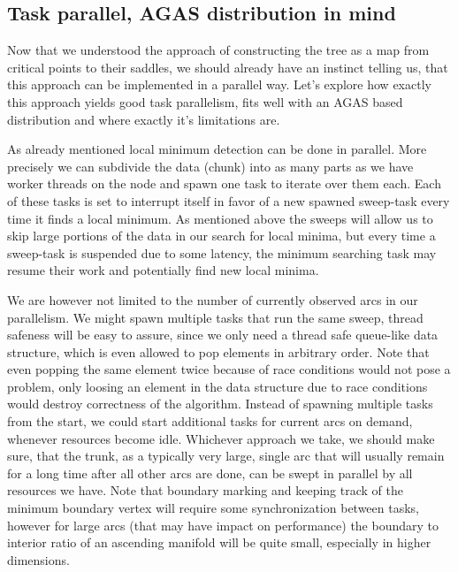 \documentclass{scrartcl}
\begin{document}
\subsection{Task parallel, AGAS distribution in mind}
Now that we understood the approach of constructing the tree as a map from critical points to their saddles, we should already have an instinct telling us, that this approach can be implemented in a parallel way. Let's explore how exactly this approach yields good task parallelism, fits well with an AGAS based distribution and where exactly it's limitations are.

As already mentioned local minimum detection can be done in parallel. More precisely we can subdivide the data (chunk) into as many parts as we have worker threads on the node and spawn one task to iterate over them each. Each of these tasks is set to interrupt itself in favor of a new spawned sweep-task every time it finds a local minimum. As mentioned above the sweeps will allow us to skip large portions of the data in our search for local minima, but every time a sweep-task is suspended due to some latency, the minimum searching task may resume their work and potentially find new local minima. 

We are however not limited to the number of currently observed arcs in our parallelism. We might spawn multiple tasks that run the same sweep, thread safeness will be easy to assure, since we only need a thread safe queue-like data structure, which is even allowed to pop elements in arbitrary order. Note that even popping the same element twice because of race conditions would not pose a problem, only loosing an element in the data structure due to race conditions would destroy correctness of the algorithm. Instead of spawning multiple tasks from the start, we could start additional tasks for current arcs on demand, whenever resources become idle. Whichever approach we take, we should make sure, that the trunk, as a typically very large, single arc that will usually remain for a long time after all other arcs are done, can be swept in parallel by all resources we have. Note that boundary marking and keeping track of the minimum boundary vertex will require some synchronization between tasks, however for large arcs (that may have impact on performance) the boundary to interior ratio of an ascending manifold will be quite small, especially in higher dimensions.
\end{document}
